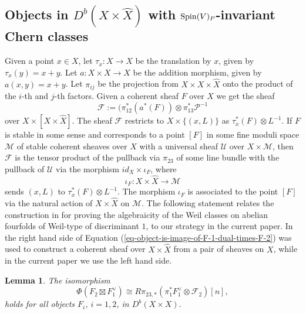 \documentclass[12pt]{amsart}
\numberwithin{equation}{subsection}
\theoremstyle{plain}
\newtheorem{lem}[thm]{Lemma}
\theoremstyle{definition}
\newcommand{\F}{{\mathcal F}}
\newcommand{\M}{{\mathcal M}}
\newcommand{\U}{{\mathcal U}}
\renewcommand{\P}{{\mathcal P}}
\newcommand{\Spin}{{\rm Spin}}
\begin{document}
% 
\subsection{Objects in $D^b(X\times\hat{X})$ with $\Spin(V)_P$-invariant Chern classes}
\label{sec-objects-with-Spin-invariant-Chern-class}
Given a point $x\in X$, let $\tau_x:X\rightarrow X$ be the translation by $x$, given by $\tau_x(y)=x+y$.
Let $a:X\times X\rightarrow X$ be the addition morphism, given by $a(x,y)=x+y$.
Let $\pi_{ij}$ be the projection from $X\times X\times \hat{X}$ onto the product of the $i$-th and $j$-th factors. 
Given a coherent sheaf $F$ over $X$ we get the sheaf 
\begin{equation}
\label{eq-universal-spreading-of-F}
\F:= (\pi_{12}^*(a^*(F))\otimes\pi_{13}^*\P^{-1}
\end{equation}
over $X\times [X\times\hat{X}]$. The sheaf $\F$ restricts to $X\times\{(x,L)\}$ as
$\tau_x^*(F)\otimes L^{-1}$. If $F$ is stable in some sense and corresponds to a point $[F]$ in some fine 
moduli space $\M$ of stable coherent sheaves over $X$ with a universal sheaf $\U$ over $X\times \M$, then 
$\F$ is the tensor product of the pullback via $\pi_{23}$ of some line bundle with the
pullback of $\U$ via the morphism $id_X\times\iota_F$, where
\begin{equation}
\label{eq-iota-F}
\iota_F:X\times \hat{X}\rightarrow \M
\end{equation} 
sends $(x,L)$ to
$\tau_x^*(F)\otimes L^{-1}$. The morphism $\iota_F$ is associated to the point $[F]$ via the natural action of $X\times\hat{X}$ on $\M$.
The following statement relates the construction in \cite[Theorem 1.5 and 13.4]{markman-generalized-kummers} for proving the algebraicity of the Weil classes on abelian fourfolds of Weil-type of discriminant $1$, to our strategy in the current paper. In \cite{markman-generalized-kummers} the right hand side of Equation (\ref{eq-object-is-image-of-F-1-dual-times-F-2}) was used to construct a coherent sheaf over $X\times\hat{X}$ from a pair of sheaves on $X$, while in the current paper we use the left hand side.

\begin{lem} The isomorphism
\begin{equation}
\label{eq-object-is-image-of-F-1-dual-times-F-2}
\Phi(F_2\boxtimes F_1^\vee)\cong
R\pi_{23,*}(\pi_1^*F_1^\vee\otimes \F_2)[n],
\end{equation} 
holds for all objects $F_i$, $i=1,2$, in $D^b(X\times X)$.
\end{lem}
\end{document}

